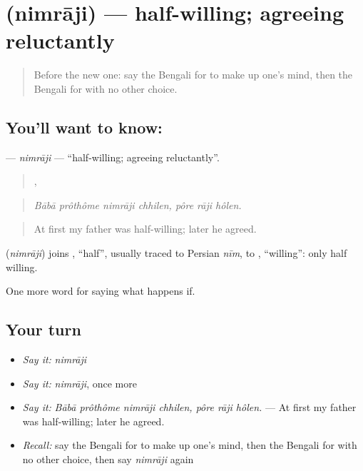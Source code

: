 \section[\texorpdfstring{\bn{নিমরাজি} (nimrāji)}{নিমরাজি (nimrāji)}]{ (nimrāji) — half-willing; agreeing reluctantly}

\label{lesson:BN-C537-nimraji}



\begin{quote}
Before the new one: say the Bengali for to make up one's mind, then the Bengali for with no other choice.
\end{quote}

\subsection*{You'll want to know: }
\textbf{} — \emph{nimrāji} — \textquotedblleft{}half-willing; agreeing reluctantly\textquotedblright{}.

\begin{quote}
   ,   
\end{quote}

\begin{quote}
\emph{Bābā prôthôme nimrāji chhilen, pôre rāji hôlen.}
\end{quote}

\begin{quote}
At first my father was half-willing; later he agreed.
\end{quote}

\begin{cousinweb}
\textbf{} (\emph{nimrāji}) joins , \textquotedblleft{}half\textquotedblright{}, usually traced to Persian \emph{nīm}, to , \textquotedblleft{}willing\textquotedblright{}: only half willing.
\end{cousinweb}

\begin{grammarlens}[title={What you've built}]
One more word for saying what happens if.
\end{grammarlens}

\subsection*{Your turn}
\begin{itemize}
\raggedright
  \item \emph{Say it:} \emph{nimrāji}
  \item \emph{Say it:} \emph{nimrāji}, once more
  \item \emph{Say it:} \emph{Bābā prôthôme nimrāji chhilen, pôre rāji hôlen.} — At first my father was half-willing; later he agreed.
  \item \emph{Recall:} say the Bengali for to make up one's mind, then the Bengali for with no other choice, then say \emph{nimrāji} again
\end{itemize}

